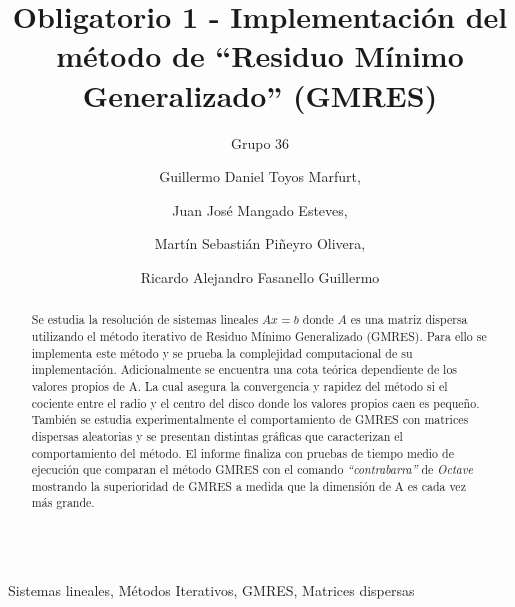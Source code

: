 \documentclass{endm}
\begin{document}
\begin{verbatim}
\end{verbatim}
\vspace{2.5cm}

\begin{frontmatter}

\title{Obligatorio 1 - Implementación del método de “Residuo Mínimo Generalizado” (GMRES)}

\subtitle{Grupo 36}

\author{Guillermo Daniel Toyos Marfurt,}
\author{Juan Jos\'e Mangado Esteves,}
\author{Martín Sebastián Piñeyro Olivera,}
\author{Ricardo Alejandro Fasanello Guillermo}

\address{Tutor: Juan Piccini}
\address{M\'etodos Num\'ericos 2020\\ Instituto de Matem\'atica y Estad\'istica\\ Facultad de Ingenier\'ia. Universidad de la Rep\'ublica\\ Montevideo, Uruguay}
\begin{abstract}
\setlength{\parindent}{12pt}
Se estudia la resolución de sistemas lineales $Ax=b$ donde $A$ es una matriz dispersa utilizando el método iterativo de Residuo Mínimo Generalizado (GMRES). Para ello se implementa este método y se prueba la complejidad computacional de su implementación. Adicionalmente se encuentra una cota teórica dependiente de los valores propios de A. La cual asegura la convergencia y rapidez del método si el cociente entre el radio y el centro del disco donde los valores propios caen es pequeño. También se estudia experimentalmente el comportamiento de GMRES con matrices dispersas aleatorias y se presentan distintas gráficas que caracterizan el comportamiento del método. El informe finaliza con pruebas de tiempo medio de ejecución que comparan el método GMRES con el comando \textit{“contrabarra”} de \textit{Octave} mostrando la superioridad de GMRES a medida que la dimensión de A es cada vez más grande.
\end{abstract}

\begin{keyword}
Sistemas lineales, Métodos Iterativos, GMRES, Matrices dispersas
\end{keyword}

\end{frontmatter}
\end{document}
